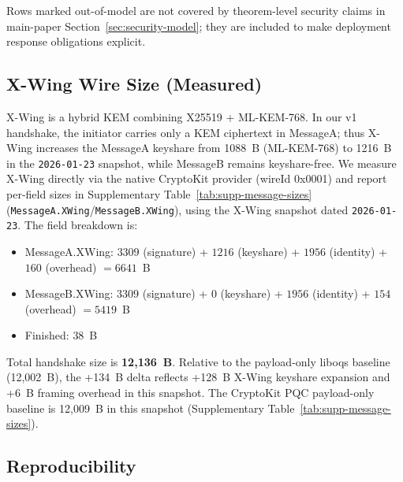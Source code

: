 \documentclass[10pt,journal,compsoc]{IEEEtran}
\newcommand{\artifactdateXWing}{2026-01-23}
\providecommand{\tightlist}{%
	  \setlength{\itemsep}{0pt}\setlength{\parskip}{0pt}}
\begin{document}
Rows marked out-of-model are not covered by theorem-level security
claims in main-paper Section~\ref{sec:security-model}; they are included
to make deployment response obligations explicit.


\subsection*{X-Wing Wire Size (Measured)}

X-Wing is a hybrid KEM combining X25519 + ML-KEM-768. In our v1
handshake, the initiator carries only a KEM ciphertext in MessageA;
thus X-Wing increases the MessageA keyshare from 1088~B (ML-KEM-768) to
1216~B in the \texttt{2026-01-23} snapshot, while MessageB remains
keyshare-free. We measure X-Wing directly via the native CryptoKit
provider (wireId 0x0001) and report per-field sizes in Supplementary
Table~\ref{tab:supp-message-sizes} (\texttt{MessageA.XWing}/\texttt{MessageB.XWing}),
using the X-Wing snapshot dated \texttt{\artifactdateXWing}. The field
breakdown is:
\begin{itemize}\tightlist
\item MessageA.XWing: $3309$ (signature) + $1216$ (keyshare) + $1956$
  (identity) + $160$ (overhead) $= 6641$~B
\item MessageB.XWing: $3309$ (signature) + $0$ (keyshare) + $1956$
  (identity) + $154$ (overhead) $= 5419$~B
\item Finished: $38$~B
\end{itemize}
Total handshake size is \textbf{12,136~B}. Relative to the payload-only
liboqs baseline (12,002~B), the +134~B delta reflects +128~B X-Wing
keyshare expansion and +6~B framing overhead in this snapshot. The
CryptoKit PQC payload-only baseline is 12,009~B in this snapshot
(Supplementary Table~\ref{tab:supp-message-sizes}).

\subsection*{Reproducibility}
\end{document}
